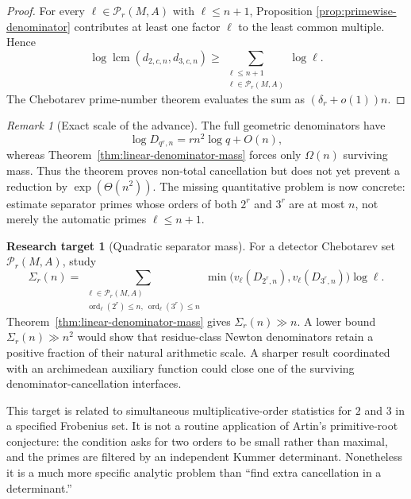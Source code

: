\documentclass[11pt,oneside]{article}
\theoremstyle{definition}
\newtheorem{target}[theorem]{Research target}
\theoremstyle{remark}
\newtheorem{remark}[theorem]{Remark}
\newcommand{\ord}{\operatorname{ord}}
\newcommand{\lcm}{\operatorname{lcm}}
\begin{document}
\begin{proof}
For every $\ell\in\mathcal P_r(M,A)$ with $\ell\le n+1$, Proposition
\ref{prop:primewise-denominator} contributes at least one factor $\ell$ to the least common
multiple.  Hence
\[
 \log\lcm(d_{2,c,n},d_{3,c,n})
 \ge \sum_{\substack{\ell\le n+1\\\ell\in\mathcal P_r(M,A)}}\log\ell.
\]
The Chebotarev prime-number theorem evaluates the sum as
$(\delta_r+o(1))n$.
\end{proof}

\begin{remark}[Exact scale of the advance]
The full geometric denominators have
\[
 \log D_{q^r,n}=rn^2\log q+O(n),
\]
whereas Theorem~\ref{thm:linear-denominator-mass} forces only $\Omega(n)$ surviving mass.
Thus the theorem proves non-total cancellation but does not yet prevent a reduction by
$\exp(\Theta(n^2))$.  The missing quantitative problem is now concrete: estimate separator
primes whose orders of both $2^r$ and $3^r$ are at most $n$, not merely the automatic primes
$\ell\le n+1$.
\end{remark}

\begin{target}[Quadratic separator mass]
\label{target:quadratic-separator-mass}
For a detector Chebotarev set $\mathcal P_r(M,A)$, study
\begin{equation}
 \Sigma_r(n)=
 \sum_{\substack{\ell\in\mathcal P_r(M,A)\\
        \ord_\ell(2^r)\le n,\ \ord_\ell(3^r)\le n}}
 \min\bigl(v_\ell(D_{2^r,n}),v_\ell(D_{3^r,n})\bigr)\log\ell.
 \label{eq:separator-mass-sum}
\end{equation}
Theorem~\ref{thm:linear-denominator-mass} gives $\Sigma_r(n)\gg n$.  A lower bound
$\Sigma_r(n)\gg n^2$ would show that residue-class Newton denominators retain a positive
fraction of their natural arithmetic scale.  A sharper result coordinated with an
archimedean auxiliary function could close one of the surviving denominator-cancellation
interfaces.
\end{target}

This target is related to simultaneous multiplicative-order statistics for $2$ and $3$ in a
specified Frobenius set.  It is not a routine application of Artin's primitive-root
conjecture: the condition asks for two orders to be small rather than maximal, and the
primes are filtered by an independent Kummer determinant.  Nonetheless it is a much more
specific analytic problem than ``find extra cancellation in a determinant.''
\end{document}
